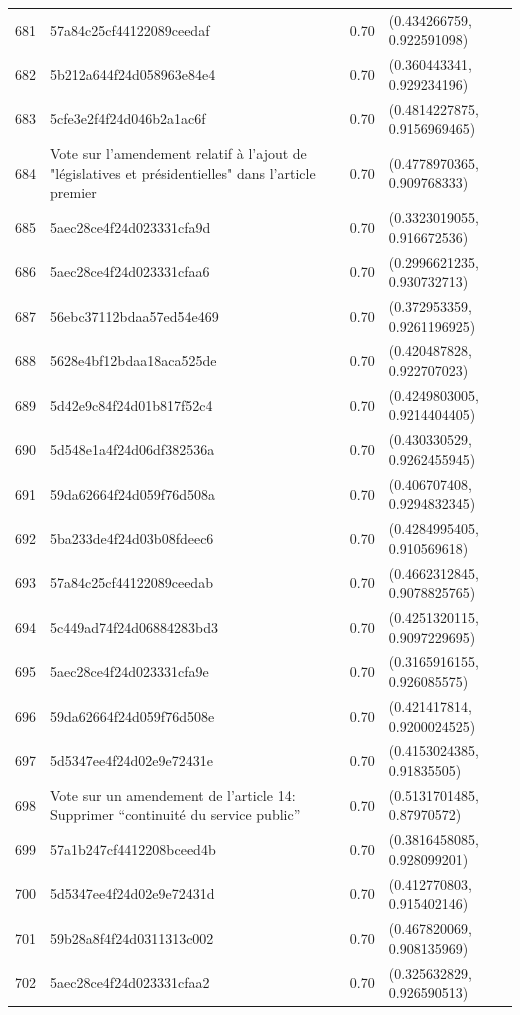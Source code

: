 \begin{table}[ht]
\begin{tabular}{rlrl}
  681 & 57a84c25cf44122089ceedaf & 0.70 & (0.434266759, 0.922591098) \\ 
  682 & 5b212a644f24d058963e84e4 & 0.70 & (0.360443341, 0.929234196) \\ 
  683 & 5cfe3e2f4f24d046b2a1ac6f & 0.70 & (0.4814227875, 0.9156969465) \\ 
  684 & Vote sur l'amendement relatif à l'ajout de "législatives et présidentielles" dans l'article premier & 0.70 & (0.4778970365, 0.909768333) \\ 
  685 & 5aec28ce4f24d023331cfa9d & 0.70 & (0.3323019055, 0.916672536) \\ 
  686 & 5aec28ce4f24d023331cfaa6 & 0.70 & (0.2996621235, 0.930732713) \\ 
  687 & 56ebc37112bdaa57ed54e469 & 0.70 & (0.372953359, 0.9261196925) \\ 
  688 & 5628e4bf12bdaa18aca525de & 0.70 & (0.420487828, 0.922707023) \\ 
  689 & 5d42e9c84f24d01b817f52c4 & 0.70 & (0.4249803005, 0.9214404405) \\ 
  690 & 5d548e1a4f24d06df382536a & 0.70 & (0.430330529, 0.9262455945) \\ 
  691 & 59da62664f24d059f76d508a & 0.70 & (0.406707408, 0.9294832345) \\ 
  692 & 5ba233de4f24d03b08fdeec6 & 0.70 & (0.4284995405, 0.910569618) \\ 
  693 & 57a84c25cf44122089ceedab & 0.70 & (0.4662312845, 0.9078825765) \\ 
  694 & 5c449ad74f24d06884283bd3 & 0.70 & (0.4251320115, 0.9097229695) \\ 
  695 & 5aec28ce4f24d023331cfa9e & 0.70 & (0.3165916155, 0.926085575) \\ 
  696 & 59da62664f24d059f76d508e & 0.70 & (0.421417814, 0.9200024525) \\ 
  697 & 5d5347ee4f24d02e9e72431e & 0.70 & (0.4153024385, 0.91835505) \\ 
  698 & Vote sur un amendement de l'article 14: Supprimer “continuité du service public” & 0.70 & (0.5131701485, 0.87970572) \\ 
  699 & 57a1b247cf4412208bceed4b & 0.70 & (0.3816458085, 0.928099201) \\ 
  700 & 5d5347ee4f24d02e9e72431d & 0.70 & (0.412770803, 0.915402146) \\ 
  701 & 59b28a8f4f24d0311313c002 & 0.70 & (0.467820069, 0.908135969) \\ 
  702 & 5aec28ce4f24d023331cfaa2 & 0.70 & (0.325632829, 0.926590513) \\ 

\end{tabular}
\end{table}
